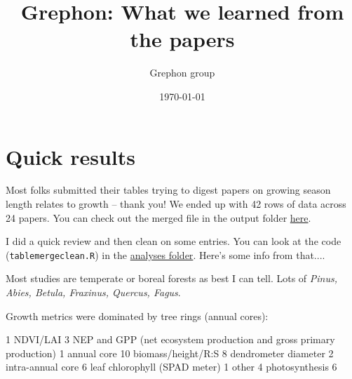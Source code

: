 \documentclass[11pt]{article}
\begin{document}
\renewcommand{\refname}{\CHead{}}

\title{Grephon: What we learned from the papers}
\date{\today}
\author{Grephon group} 
\maketitle

\tableofcontents

\section{Quick results}

Most folks submitted their tables trying to digest papers on growing season length relates to growth -- thank you! We ended up with 42 rows of data across 24 papers. You can check out the merged file in the output folder \href{https://github.com/lizzieinvancouver/grephon/tree/main/analyses}{here}.

I did a quick review and then clean on some entries. You can look at the code (\verb|tablemergeclean.R|) in the \href{https://github.com/lizzieinvancouver/grephon/tree/main/analyses}{analyses folder}. Here's some info from that....

Most studies are temperate or boreal forests as best I can tell. Lots of \emph{Pinus, Abies, Betula, Fraxinus, Quercus, Fagus}.

Growth metrics were dominated by tree rings (annual cores):
\begin{Schunk}
\begin{Soutput}
                                                                  1 
                                                           NDVI/LAI 
                                                                  3 
NEP and GPP (net ecosystem production and gross primary production) 
                                                                  1 
                                                        annual core 
                                                                 10 
                                                 biomass/height/R:S 
                                                                  8 
                                               dendrometer diameter 
                                                                  2 
                                                  intra-annual core 
                                                                  6 
                                      leaf chlorophyll (SPAD meter) 
                                                                  1 
                                                              other 
                                                                  4 
                                                     photosynthesis 
                                                                  6 
\end{Soutput}
\end{Schunk}
\end{document}
